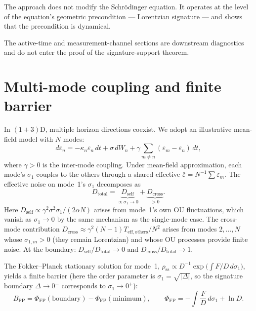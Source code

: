 \documentclass[11pt,a4paper]{article}
\theoremstyle{definition}
\begin{document}
The approach does not modify the Schr\"odinger equation. It operates at the level of the equation's geometric precondition --- Lorentzian signature --- and shows that the precondition is dynamical.

The active-time and measurement-channel sections are downstream diagnostics
and do not enter the proof of the signature-support theorem.


\appendix

\section{Multi-mode coupling and finite barrier}\label{app:multimode}


In $(1{+}3)$D, multiple horizon directions coexist. We adopt an illustrative mean-field model with $N$ modes:
\begin{equation}
d\varepsilon_n = -\kappa_n \varepsilon_n\,dt + \sigma\,dW_n + \gamma\sum_{m\neq n}(\varepsilon_m - \varepsilon_n)\,dt,
\label{eq:multimode}
\end{equation}
where $\gamma > 0$ is the inter-mode coupling. Under mean-field approximation, each mode's $\sigma_1$ couples to the others through a shared effective $\bar\varepsilon = N^{-1}\sum\varepsilon_m$. The effective noise on mode~1's $\sigma_1$ decomposes as
\begin{equation}
D_{\mathrm{total}} = \underbrace{D_{\mathrm{self}}}_{\propto \sigma_1 \to 0} + \underbrace{D_{\mathrm{cross}}}_{> 0}.
\end{equation}
Here $D_{\mathrm{self}} \propto \gamma^2\sigma^2\sigma_1/(2\alpha N)$ arises from mode~1's own OU fluctuations, which vanish as $\sigma_1 \to 0$ by the same mechanism as the single-mode case. The cross-mode contribution $D_{\mathrm{cross}} \approx \gamma^2(N{-}1)T_{\mathrm{eff,others}}/N^2$ arises from modes $2,\ldots,N$ whose $\sigma_{1,m} > 0$ (they remain Lorentzian) and whose OU processes provide finite noise. At the boundary: $D_{\mathrm{self}}/D_{\mathrm{total}} \to 0$ and $D_{\mathrm{cross}}/D_{\mathrm{total}} \to 1$.

The Fokker--Planck stationary solution for mode~1, $\rho_{\mathrm{ss}} \propto D^{-1}\exp\!\bigl(\int F/D\,d\sigma_1\bigr)$, yields a finite barrier (here the order parameter is $\sigma_1 = \sqrt{|\Delta|}$, so the signature boundary $\Delta\to0^-$ corresponds to $\sigma_1\to0^+$):
\begin{equation}
B_{\mathrm{FP}} = \Phi_{\mathrm{FP}}(\text{boundary}) - \Phi_{\mathrm{FP}}(\text{minimum}), \qquad \Phi_{\mathrm{FP}} = -\!\int \frac{F}{D}\,d\sigma_1 + \ln D.
\label{eq:barrier}
\end{equation}
\end{document}
